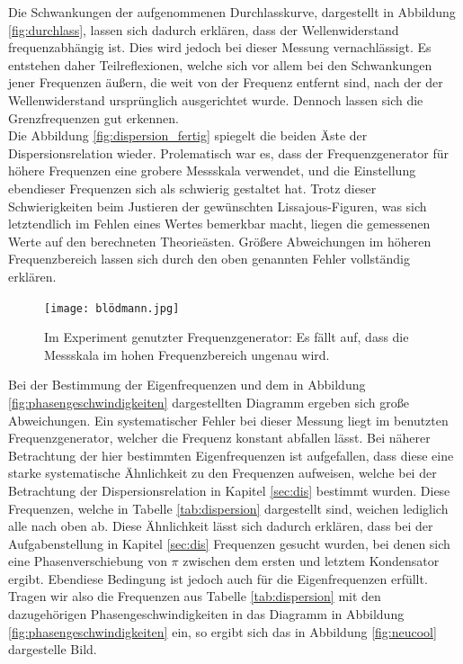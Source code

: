 Die Schwankungen der aufgenommenen Durchlasskurve, dargestellt in Abbildung \ref{fig:durchlass}, lassen sich dadurch erklären, dass der Wellenwiderstand frequenzabhängig ist.
Dies wird jedoch bei dieser Messung vernachlässigt.
Es entstehen daher Teilreflexionen, welche sich vor allem bei den Schwankungen jener Frequenzen äußern, die weit von der Frequenz entfernt sind, nach der der Wellenwiderstand ursprünglich ausgerichtet wurde.
Dennoch lassen sich die Grenzfrequenzen gut erkennen.\\
Die Abbildung \ref{fig:dispersion_fertig} spiegelt die beiden Äste der Dispersionsrelation wieder.
Prolematisch war es, dass der Frequenzgenerator für höhere Frequenzen eine grobere Messskala verwendet, und die Einstellung ebendieser Frequenzen sich als schwierig gestaltet hat.
Trotz dieser Schwierigkeiten beim Justieren der gewünschten Lissajous-Figuren, was sich letztendlich im Fehlen eines Wertes bemerkbar macht, liegen die gemessenen Werte auf den berechneten Theorieästen.
Größere Abweichungen im höheren Frequenzbereich lassen sich durch den oben genannten Fehler vollständig erklären.\\
\begin{figure}[H]
  \centering
  \texttt{[image: blödmann.jpg]}
  \caption{Im Experiment genutzter Frequenzgenerator: Es fällt auf, dass die Messskala im hohen Frequenzbereich ungenau wird.}
  \label{fig:bloedmann}
\end{figure}
Bei der Bestimmung der Eigenfrequenzen und dem in Abbildung \ref{fig:phasengeschwindigkeiten} dargestellten Diagramm ergeben sich große Abweichungen.
Ein systematischer Fehler bei dieser Messung liegt im benutzten Frequenzgenerator, welcher die Frequenz konstant abfallen lässt.
Bei näherer Betrachtung der hier bestimmten Eigenfrequenzen ist aufgefallen, dass diese eine starke systematische Ähnlichkeit zu den Frequenzen aufweisen, welche bei der Betrachtung der Dispersionsrelation in Kapitel \ref{sec:dis} bestimmt wurden.
Diese Frequenzen, welche in Tabelle \ref{tab:dispersion} dargestellt sind, weichen lediglich alle nach oben ab.
Diese Ähnlichkeit lässt sich dadurch erklären, dass bei der Aufgabenstellung in Kapitel \ref{sec:dis} Frequenzen gesucht wurden, bei denen sich eine Phasenverschiebung von $\pi$ zwischen dem ersten und letztem Kondensator ergibt.
Ebendiese Bedingung ist jedoch auch für die Eigenfrequenzen erfüllt.
Tragen wir also die Frequenzen aus Tabelle \ref{tab:dispersion} mit den dazugehörigen Phasengeschwindigkeiten in das Diagramm in Abbildung \ref{fig:phasengeschwindigkeiten} ein, so ergibt sich das in Abbildung \ref{fig:neucool} dargestelle Bild.
